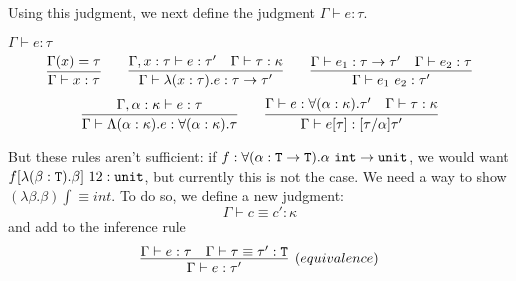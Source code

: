 Using this judgment, we next define the judgment $\Gamma \vdash e : \tau$.

\begin{judgment}
$\Gamma \vdash e : \tau$
\[
  \infer{\Gamma \vdash x : \tau}{\Gamma(x) = \tau}
  \qquad
  \infer{\Gamma \vdash \lambda(x : \tau).e : \tau \rightarrow \tau'}
        {\Gamma, x : \tau \vdash e : \tau'
        &\Gamma \vdash \tau : \kappa
        }
  \qquad
  \infer{\Gamma \vdash e_1 ~ e_2 : \tau'}
        {\Gamma \vdash e_1 : \tau \rightarrow \tau'
        &\Gamma \vdash e_2 : \tau
        }
\]
\[
  \infer{\Gamma \vdash \Lambda (\alpha : \kappa).e : \forall (\alpha : \kappa).\tau}
        {\Gamma, \alpha : \kappa \vdash e : \tau}
  \qquad
  \infer{\Gamma \vdash e[\tau] : [\tau / \alpha]\tau'}
        {\Gamma \vdash e : \forall(\alpha : \kappa).\tau'
        &\Gamma \vdash \tau : \kappa
        }
\]
\end{judgment}

But these rules aren't sufficient: if
$f : \forall(\alpha : \mathtt{T} \rightarrow \mathtt{T}). \alpha~\mathtt{int} \rightarrow \mathtt{unit}$,
we would want \mbox{$f[\lambda(\beta : \mathtt{T}).\beta]~12 : \mathtt{unit}$}, but
currently this is not the case. We need a way to show
\mbox{$(\lambda \beta. \beta) \int \equiv int$}. To do so,
we define a new judgment:
\[\Gamma \vdash c \equiv c' : \kappa\]
and add to  the inference rule
\[\infer[(equivalence)]{\Gamma \vdash e : \tau'}
  {\Gamma \vdash e : \tau
  &\Gamma \vdash \tau \equiv \tau' : \T
  }
\]

